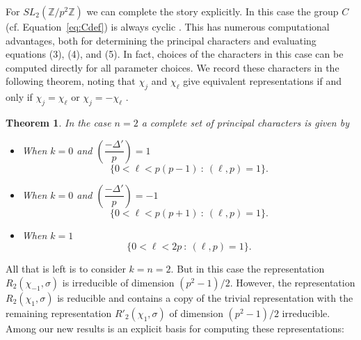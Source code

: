 \documentclass[12pt,reqno]{amsart}
\newtheorem{theorem}{Theorem}[section]
\theoremstyle{remark}
\numberwithin{table}{section}
\newcommand{\Z}{\mathbb Z}
\begin{document}
For $SL_2(\Z/p^2\Z)$ we can complete the story explicitly. In this case the group $C$ (cf. Equation~\ref{eq:Cdef}) is always cyclic \cite{Kloosterman46}. This has numerous computational advantages, both for determining the principal characters and evaluating equations (3), (4), and (5). In fact, choices of the characters in this case can be computed directly for all parameter choices. We record these characters in the following theorem, noting that $\chi_j$ and $\chi_\ell$ give equivalent representations if and only if $\chi_j=\chi_\ell$ or $\chi_j=-\chi_\ell$ \cite{Tanaka67-1}. 
 
 \begin{theorem}\label{thm:sl2smallk}
In the case $n=2$ a complete set of principal characters 
is given by
 \begin{itemize}
 \item When $k=0$ and $\left(\dfrac{-\Delta'}{p}\right)=1$   $$\{ 0< \ell <p(p-1)\ :\  (\ell,p)=1\}.$$
 \item When $k=0$ and $\left(\dfrac{-\Delta'}{p}\right)=-1$  $$\{ 0< \ell <p(p+1)\ :\ (\ell,p)=1\}.$$
 \item When $k=1$  $$\{0<\ell<2p\ :\ (\ell,p)=1\}.$$
 \end{itemize}
 \end{theorem}




All that is left is to consider $k=n = 2$. But in this  case the representation $R_2(\chi_{-1}, \sigma)$ is irreducible of dimension $(p^2-1)/2$. However, the representation $R_2(\chi_1, \sigma)$ is reducible and contains a copy of the trivial representation with the remaining representation $R'_2(\chi_1, \sigma)$ of dimension $(p^2-1)/2$ irreducible. Among our new results is an explicit basis for computing these representations: 
\end{document}
